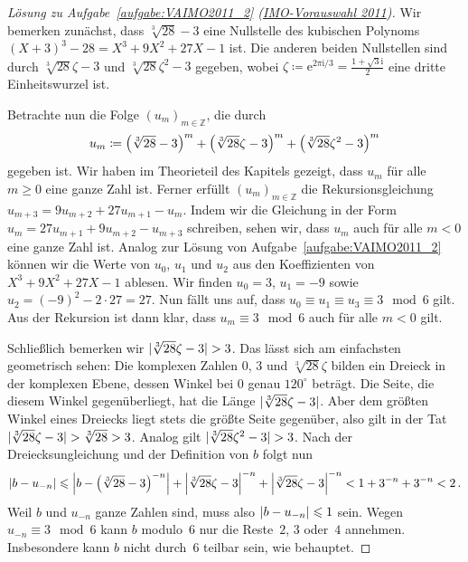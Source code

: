 \begin{proof}[Lösung zu Aufgabe~\ref{aufgabe:VAIMO2011_2} \textmd{(\href{https://www.mathe-wettbewerbe.de/fileadmin/Mathe-Wettbewerbe/AIMO/Aufgaben_und_Loesungen_AIMO/aufgaben_awb_11.pdf}{IMO-Vorauswahl 2011})}]
	Wir bemerken zunächst, dass $\sqrt[3]{28}-3$ eine Nullstelle des kubischen Polynoms $(X+3)^3-28=X^3+9X^2+27X-1$ ist. Die anderen beiden Nullstellen sind durch $\sqrt[3]{28}\zeta-3$ und $\sqrt[3]{28}\zeta^2-3$ gegeben, wobei $\zeta\coloneqq \mathrm{e}^{2\pi\mathrm{i}/3}=\frac{1+\sqrt{3}\mathrm{i}}{2}$ eine dritte Einheitswurzel ist.
	
	Betrachte nun die Folge $(u_m)_{m\in\mathbb Z}$, die durch
	\begin{equation*}
		u_m\coloneqq \parens*{\sqrt[3]{28}-3}^m+\parens*{\sqrt[3]{28}\zeta-3}^m+\parens*{\sqrt[3]{28}\zeta^2-3}^m
	\end{equation*}
	gegeben ist. Wir haben im Theorieteil des Kapitels gezeigt, dass $u_m$ für alle $m\geqslant 0$ eine ganze Zahl ist. Ferner erfüllt $(u_m)_{m\in\mathbb Z}$ die Rekursionsgleichung $u_{m+3}=9u_{m+2}+27u_{m+1}-u_m$. Indem wir die Gleichung in der Form $u_{m}=27u_{m+1}+9u_{m+2}-u_{m+3}$ schreiben, sehen wir, dass $u_m$ auch für alle $m<0$ eine ganze Zahl ist. Analog zur Lösung von Aufgabe~\ref{aufgabe:VAIMO2011_2} können wir die Werte von $u_0$, $u_1$ und $u_2$ aus den Koeffizienten von $X^3+9X^2+27X-1$ ablesen. Wir finden $u_0=3$, $u_1=-9$ sowie $u_2=(-9)^2-2\cdot 27=27$. Nun fällt uns auf, dass $u_0\equiv u_1\equiv u_3\equiv 3\mod 6$ gilt. Aus der Rekursion ist dann klar, dass $u_m\equiv 3\mod 6$ auch für alle $m<0$ gilt.
	
	Schließlich bemerken wir $\abs{\sqrt[3]{28}\zeta-3}>3$. Das lässt sich am einfachsten geometrisch sehen: Die komplexen Zahlen $0$, $3$ und $\sqrt[3]{28}\zeta$ bilden ein Dreieck in der komplexen Ebene, dessen Winkel bei $0$ genau $120^\circ$ beträgt. Die Seite, die diesem Winkel gegenüberliegt, hat die Länge $\abs{\sqrt[3]{28}\zeta-3}$. Aber dem größten Winkel eines Dreiecks liegt stets die größte Seite gegenüber, also gilt in der Tat $\abs{\sqrt[3]{28}\zeta-3}>\sqrt[3]{28}>3$. Analog gilt $\abs{\sqrt[3]{28}\zeta^2-3}>3$. Nach der Dreiecksungleichung und der Definition von $b$ folgt nun
	\begin{equation*}
		\abs*{b-u_{-n}}\leqslant \abs[\Big]{b-\parens*{\sqrt[3]{28}-3}^{-n}}+\abs*{\sqrt[3]{28}\zeta-3}^{-n}+\abs*{\sqrt[3]{28}\zeta-3}^{-n}<1+3^{-n}+3^{-n}<2\,.
	\end{equation*}
	Weil $b$ und $u_{-n}$ ganze Zahlen sind, muss also $\abs*{b-u_{-n}}\leqslant 1$ sein. Wegen $u_{-n}\equiv 3\mod 6$ kann $b$ modulo~$6$ nur die Reste~$2$, $3$ oder~$4$ annehmen. Insbesondere kann $b$ nicht durch~$6$ teilbar sein, wie behauptet.
\end{proof}